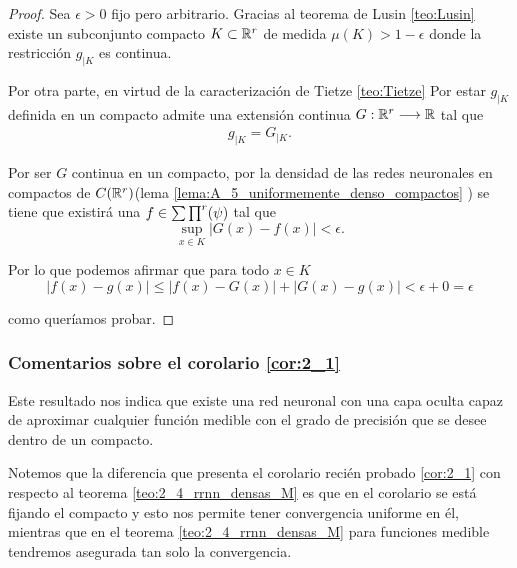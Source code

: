 \begin{proof}
    Sea $\epsilon > 0$ fijo pero arbitrario.  Gracias al teorema de Lusin \ref{teo:Lusin}
    existe un subconjunto compacto $K \subset \mathbb{R}^r$ de medida
    $\mu(K) > 1 - \epsilon$ donde la restricción  $g_{|K}$ es continua. 

    Por otra parte, en virtud de la caracterización de Tietze 
    \ref{teo:Tietze} 
    Por estar $g_{|K}$ definida en un compacto admite una 
    extensión continua $G:\mathbb{R}^r \longrightarrow \mathbb{R}$ tal que 
    \begin{equation}
        \begin{split}
            g_{|K} = G_{|K} .
        \end{split}
    \end{equation}

    Por ser $G$ continua en un compacto, por la densidad de las redes neuronales en compactos de $C(\mathbb{R}^r)$(lema \ref{lema:A_5_uniformemente_denso_compactos} ) se tiene que existirá 
    una $f \in \sum \prod^r (\psi)$ tal que 
    \begin{equation}
        \sup_{x \in K} |G(x) - f(x)| < \epsilon.
    \end{equation}

    Por lo que podemos afirmar que para todo $x \in K$
    \begin{equation}
        |f(x) -g(x)| 
        \leq 
        | f(x) -G(x)| + |G(x) -g(x)|
        < \epsilon + 0 = \epsilon
    \end{equation}

    como queríamos probar.
\end{proof}

\subsubsection{Comentarios sobre el corolario \ref{cor:2_1}}  

Este resultado nos indica que existe una red neuronal con una 
capa oculta capaz de aproximar cualquier función medible con el grado 
de precisión que se desee dentro de un compacto.   

Notemos que la diferencia que presenta el corolario recién probado
\ref{cor:2_1} con respecto al teorema \ref{teo:2_4_rrnn_densas_M}
es que en el corolario se está fijando el compacto y esto nos 
permite tener convergencia uniforme en él, mientras que en el 
teorema \ref{teo:2_4_rrnn_densas_M} para funciones medible
tendremos asegurada tan solo la convergencia. 
